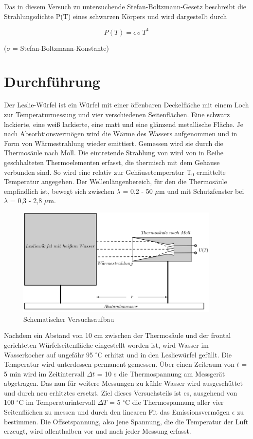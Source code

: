 Das in diesem Versuch zu untersuchende Stefan-Boltzmann-Gesetz beschreibt die Strahlungsdichte P(T) eines schwarzen Körpers und wird
dargestellt durch

\begin{formel}
\begin{equation}
 P(T) = \epsilon \, \sigma \, T^4
 \label{Boltz}
 \end{equation}
\caption*{\small{($\sigma$ = Stefan-Boltzmann-Konstante)}}
\end{formel}

\section{Durchführung}
Der Leslie-Würfel ist ein Würfel mit einer öffenbaren Deckelfläche mit einem Loch zur Temperaturmessung und vier verschiedenen Seitenflächen.
Eine schwarz lackierte, eine weiß lackierte, eine matt und eine glänzend metallische Fläche. Je nach Absorbtionsvermögen wird die Wärme
des Wassers aufgenommen und in Form von Wärmestrahlung wieder emittiert. Gemessen wird sie durch die Thermosäule nach Moll. Die eintretende
Strahlung von wird von in Reihe geschhalteten Thermoelementen erfasst, die thermisch mit dem Gehäuse verbunden sind. So wird eine relativ
zur Gehäusetemperatur T$_0$ ermittelte Temperatur angegeben. Der Wellenlängenbereich, für den die Thermosäule empfindlich ist, bewegt sich
zwischen $\lambda$ = 0,2 - 50 $\mu$m und mit Schutzfenster bei $\lambda$ = 0,3 - 2,8 $\mu$m.

\begin{figure}[H]
 \includegraphics[width=0.9\textwidth]{pics/207b.png}
 \centering
 \caption{Schematischer Versuchsaufbau}
 \label{Aufbau}
\end{figure}

Nachdem ein Abstand von 10 cm zwischen der Thermosäule und der frontal gerichteten Würfelseitenfläche eingestellt worden ist, wird 
Wasser im Wasserkocher auf ungefähr 95 $^\circ$C erhitzt und in den Lesliewürfel gefüllt. Die Temperatur wird unterdessen permanent
gemessen. Über einen Zeitraum von $t$ = 5 min wird im Zeitintervall $\Delta t$ = 10 s die Thermospannung am Messgerät abgetragen. Das
nun für weitere Messungen zu kühle Wasser wird ausgeschüttet und durch neu erhitztes ersetzt. Ziel dieses Versuchsteils ist es, ausgehend
von 100 $^\circ$C im Temperaturintervall $\Delta T$ = 5 $^\circ$C die Thermospannung aller vier Seitenflächen zu messen und durch den
linearen Fit das Emissionsvermögen $\epsilon$ zu bestimmen. Die Offsetspannung, also jene Spannung, die die Temperatur der Luft
erzeugt, wird allenthalben vor und nach jeder Messung erfasst.

